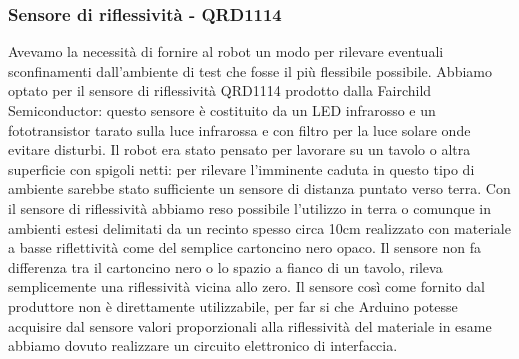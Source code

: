 \subsubsection{Sensore di riflessività - QRD1114}
Avevamo la necessità di fornire al robot un modo per rilevare eventuali 
sconfinamenti dall'ambiente di test che fosse il più flessibile possibile. 
Abbiamo optato per il sensore di riflessività QRD1114 prodotto dalla Fairchild 
Semiconductor: questo sensore è costituito da un LED infrarosso e un 
fototransistor tarato sulla luce infrarossa e con filtro per la luce solare 
onde evitare disturbi. Il robot era stato pensato per lavorare su un tavolo o 
altra superficie con spigoli netti: per rilevare l'imminente caduta in questo 
tipo di ambiente sarebbe stato sufficiente un sensore di distanza puntato 
verso terra. Con il sensore di riflessività abbiamo reso possibile l'utilizzo 
in terra o comunque in ambienti estesi delimitati da un recinto spesso circa 
10cm realizzato con materiale a basse riflettività come del semplice 
cartoncino nero opaco. Il sensore non fa differenza tra il cartoncino nero o 
lo spazio a fianco di un tavolo, rileva semplicemente una riflessività vicina 
allo zero. Il sensore così come fornito dal produttore non è direttamente 
utilizzabile, per far si che Arduino potesse acquisire dal sensore valori 
proporzionali alla riflessività del materiale in esame abbiamo dovuto 
realizzare un circuito elettronico di interfaccia. 
